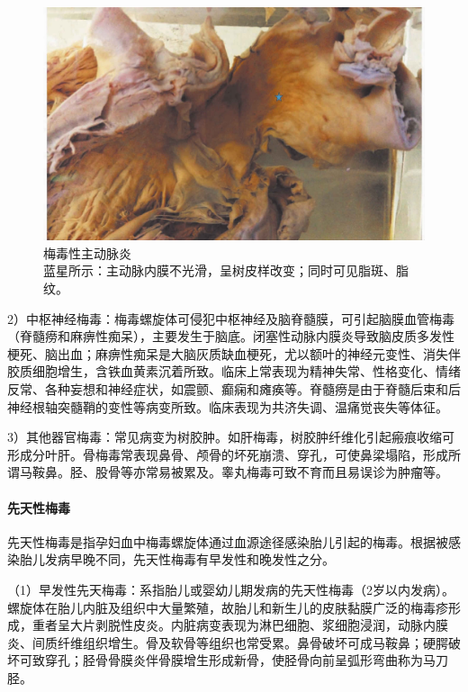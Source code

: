 \begin{figure}[!htbp]
    \centering
    \includegraphics{./images/Image00243.jpg}
    \captionsetup{justification=centering}
    \caption{梅毒性主动脉炎\\ {\small 蓝星所示：主动脉内膜不光滑，呈树皮样改变；同时可见脂斑、脂纹。}}
    \label{fig14-18}
\end{figure}

2）中枢神经梅毒：梅毒螺旋体可侵犯中枢神经及脑脊髓膜，可引起脑膜血管梅毒（脊髓痨和麻痹性痴呆），主要发生于脑底。闭塞性动脉内膜炎导致脑皮质多发性梗死、脑出血；麻痹性痴呆是大脑灰质缺血梗死，尤以额叶的神经元变性、消失伴胶质细胞增生，含铁血黄素沉着所致。临床上常表现为精神失常、性格变化、情绪反常、各种妄想和神经症状，如震颤、癫痫和瘫痪等。脊髓痨是由于脊髓后束和后神经根轴突髓鞘的变性等病变所致。临床表现为共济失调、温痛觉丧失等体征。

3）其他器官梅毒：常见病变为树胶肿。如肝梅毒，树胶肿纤维化引起瘢痕收缩可形成分叶肝。骨梅毒常表现鼻骨、颅骨的坏死崩溃、穿孔，可使鼻梁塌陷，形成所谓马鞍鼻。胫、股骨等亦常易被累及。睾丸梅毒可致不育而且易误诊为肿瘤等。

\paragraph{先天性梅毒}
先天性梅毒是指孕妇血中梅毒螺旋体通过血源途径感染胎儿引起的梅毒。根据被感染胎儿发病早晚不同，先天性梅毒有早发性和晚发性之分。

（1）早发性先天梅毒：系指胎儿或婴幼儿期发病的先天性梅毒（2岁以内发病）。螺旋体在胎儿内脏及组织中大量繁殖，故胎儿和新生儿的皮肤黏膜广泛的梅毒疹形成，重者呈大片剥脱性皮炎。内脏病变表现为淋巴细胞、浆细胞浸润，动脉内膜炎、间质纤维组织增生。骨及软骨等组织也常受累。鼻骨破坏可成马鞍鼻；硬腭破坏可致穿孔；胫骨骨膜炎伴骨膜增生形成新骨，使胫骨向前呈弧形弯曲称为马刀胫。

